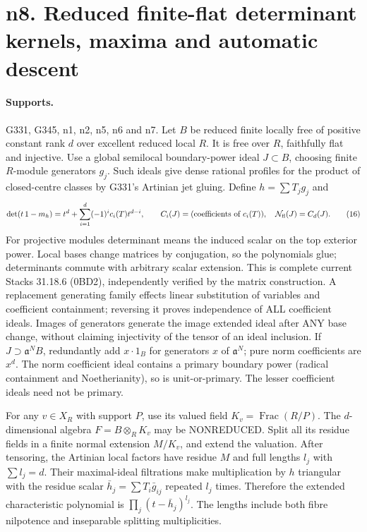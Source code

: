 \section{n8. Reduced finite-flat determinant kernels, maxima and automatic descent}
\paragraph{Supports.} G331, G345, n1, n2, n5, n6 and n7.
Let $B$ be reduced finite locally free of positive constant rank $d$ over excellent reduced local $R$. It is free over $R$, faithfully flat and injective. Use a global semilocal boundary-power ideal $J\subset B$, choosing finite $R$-module generators $g_j$. Such ideals give dense rational profiles for the product of closed-centre classes by G331's Artinian jet gluing. Define $h=\sum T_jg_j$ and
\[
 \det(t\,1-m_h)=t^d+\sum_{i=1}^d(-1)^ic_i(T)t^{d-i},\qquad
 C_i(J)=(\text{coefficients of }c_i(T)),\quad \mathcal N_{\rm fl}(J)=C_d(J). \tag{16}
\]
For projective modules determinant means the induced scalar on the top exterior power. Local bases change matrices by conjugation, so the polynomials glue; determinants commute with arbitrary scalar extension. This is complete current Stacks 31.18.6 (0BD2), independently verified by the matrix construction. A replacement generating family effects linear substitution of variables and coefficient containment; reversing it proves independence of ALL coefficient ideals. Images of generators generate the image extended ideal after ANY base change, without claiming injectivity of the tensor of an ideal inclusion. If $J\supset\mathfrak a^NB$, redundantly add $x\cdot1_B$ for generators $x$ of $\mathfrak a^N$; pure norm coefficients are $x^d$. The norm coefficient ideal contains a primary boundary power (radical containment and Noetherianity), so is unit-or-primary. The lesser coefficient ideals need not be primary.

For any $v\in X_R$ with support $P$, use its valued field $K_v=\operatorname{Frac}(R/P)$. The $d$-dimensional algebra $F=B\otimes_RK_v$ may be NONREDUCED. Split all its residue fields in a finite normal extension $M/K_v$, and extend the valuation. After tensoring, the Artinian local factors have residue $M$ and full lengths $l_j$ with $\sum l_j=d$. Their maximal-ideal filtrations make multiplication by $h$ triangular with the residue scalar $\bar h_j=\sum T_i\bar g_{ij}$ repeated $l_j$ times. Therefore the extended characteristic polynomial is $\prod_j(t-\bar h_j)^{l_j}$. The lengths include both fibre nilpotence and inseparable splitting multiplicities.

